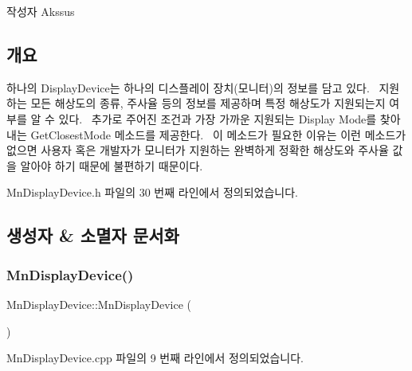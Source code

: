 \begin{DoxyAuthor}{작성자}
Akssus 
\end{DoxyAuthor}
\hypertarget{class_m_n_l_1_1_mn_video_adapter_개요}{}\subsection{개요}\label{class_m_n_l_1_1_mn_video_adapter_개요}
하나의 Display\+Device는 하나의 디스플레이 장치(모니터)의 정보를 담고 있다.~\newline
지원하는 모든 해상도의 종류, 주사율 등의 정보를 제공하며 특정 해상도가 지원되는지 여부를 알 수 있다.~\newline
추가로 주어진 조건과 가장 가까운 지원되는 Display Mode를 찾아내는 Get\+Closest\+Mode 메소드를 제공한다.~\newline
이 메소드가 필요한 이유는 이런 메소드가 없으면 사용자 혹은 개발자가 모니터가 지원하는 완벽하게 정확한 해상도와 주사율 값을 알아야 하기 때문에 불편하기 때문이다.~\newline


Mn\+Display\+Device.\+h 파일의 30 번째 라인에서 정의되었습니다.



\subsection{생성자 \& 소멸자 문서화}
\mbox{\label{class_m_n_l_1_1_mn_display_device_af7f8cbdfc1a219e619930df164ef1b1b}} 
\subsubsection{\texorpdfstring{Mn\+Display\+Device()}{MnDisplayDevice()}}
{\footnotesize\ttfamily Mn\+Display\+Device\+::\+Mn\+Display\+Device (\begin{DoxyParamCaption}{ }\end{DoxyParamCaption})}



Mn\+Display\+Device.\+cpp 파일의 9 번째 라인에서 정의되었습니다.

\mbox{\label{class_m_n_l_1_1_mn_display_device_a482d7838429f83ed1676d6a784dade88}} 
